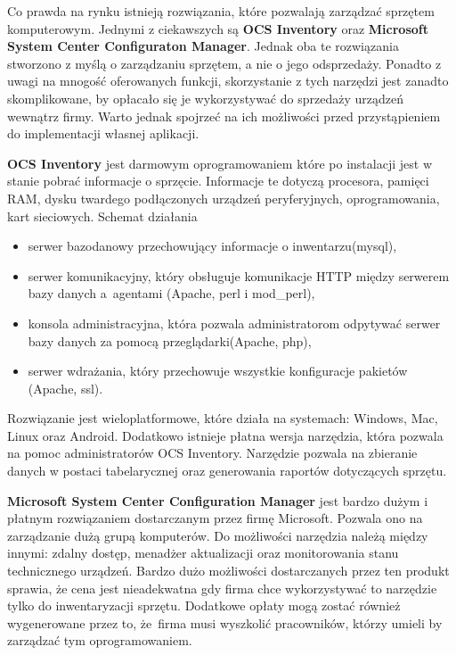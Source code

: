 Co prawda na rynku istnieją rozwiązania, które pozwalają zarządzać sprzętem komputerowym. Jednymi z ciekawszych są \textbf{OCS Inventory} oraz \textbf{Microsoft System Center Configuraton Manager}. Jednak oba te rozwiązania stworzono z myślą o zarządzaniu sprzętem, a nie o jego odsprzedaży. Ponadto z uwagi na mnogość oferowanych funkcji, skorzystanie z tych narzędzi jest zanadto skomplikowane, by opłacało się je wykorzystywać do sprzedaży urządzeń wewnątrz firmy. Warto jednak spojrzeć na ich możliwości przed przystąpieniem do implementacji własnej aplikacji.

\textbf{OCS Inventory} jest darmowym oprogramowaniem które po instalacji jest w stanie pobrać informacje o sprzęcie. Informacje te dotyczą procesora, pamięci RAM, dysku twardego podłączonych urządzeń peryferyjnych, oprogramowania, kart sieciowych.
\newline
Schemat działania
\begin{itemize}
	\item serwer bazodanowy przechowujący informacje o inwentarzu(mysql),
	\item serwer komunikacyjny, który obsługuje komunikacje HTTP między serwerem bazy danych a~agentami (Apache, perl i mod\_perl),
	\item konsola administracyjna, która pozwala administratorom odpytywać serwer bazy danych za pomocą przeglądarki(Apache, php),
	\item serwer wdrażania, który przechowuje wszystkie konfiguracje pakietów (Apache, ssl).
\end{itemize}
Rozwiązanie jest wieloplatformowe, które działa na systemach: Windows, Mac, Linux oraz Android. Dodatkowo istnieje płatna wersja narzędzia, która pozwala na pomoc administratorów OCS Inventory. Narzędzie pozwala na zbieranie danych w postaci tabelarycznej oraz generowania raportów dotyczących sprzętu. 

\textbf{Microsoft System Center Configuration Manager} jest bardzo dużym i płatnym rozwiązaniem dostarczanym przez firmę Microsoft. Pozwala ono na zarządzanie dużą grupą komputerów. Do możliwości narzędzia należą między innymi: zdalny dostęp, menadżer aktualizacji oraz monitorowania stanu technicznego urządzeń. Bardzo dużo możliwości dostarczanych przez ten produkt sprawia, że cena jest nieadekwatna gdy firma chce wykorzystywać to narzędzie tylko do inwentaryzacji sprzętu. Dodatkowe opłaty mogą zostać również wygenerowane przez to, że~firma musi wyszkolić pracowników, którzy umieli by zarządzać tym oprogramowaniem.


